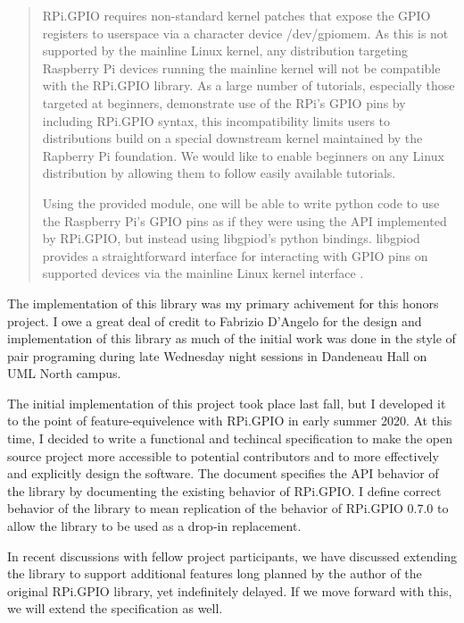\documentclass{article}
\begin{document}
\begin{quote}
RPi.GPIO requires non-standard kernel patches that expose the GPIO registers to userspace via a character device /dev/gpiomem. As this is not supported by the mainline Linux kernel, any distribution targeting Raspberry Pi devices running the mainline kernel will not be compatible with the RPi.GPIO library. As a large number of tutorials, especially those targeted at beginners, demonstrate use of the RPi's GPIO pins by including RPi.GPIO syntax, this incompatibility limits users to distributions build on a special downstream kernel maintained by the Rapberry Pi foundation. We would like to enable beginners on any Linux distribution by allowing them to follow easily available tutorials.

Using the provided module, one will be able to write python code to use the Raspberry Pi's GPIO pins as if they were using the API implemented by RPi.GPIO, but instead using libgpiod's python bindings. libgpiod provides a straightforward interface for interacting with GPIO pins on supported devices via the mainline Linux kernel interface \cite{underground}.
\end{quote}

The implementation of this library
was my primary achivement for this honors project.
I owe a great deal of credit
to Fabrizio D'Angelo
for the design and implementation
of this library
as much of the initial work
was done in the style of pair programing
during late Wednesday night sessions
in Dandeneau Hall on UML North campus.

The initial implementation of this project
took place last fall,
but I developed it to the point
of feature-equivelence
with RPi.GPIO in early summer 2020.
At this time,
I decided to write
a functional and techincal specification
to make the open source project more accessible
to potential contributors
and to more effectively and explicitly
design the software.
The document specifies the API behavior of the library
by documenting the existing behavior of RPi.GPIO.
I define correct behavior of the library
to mean replication of the behavior of RPi.GPIO 0.7.0
to allow the library to be used as a drop-in replacement.

In recent discussions with fellow project participants,
we have discussed extending the library
to support additional features
long planned by the author of the original RPi.GPIO library,
yet indefinitely delayed.
If we move forward with this,
we will extend the specification as well.
\end{document}
